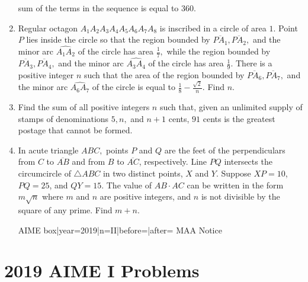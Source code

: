 \documentclass{article}
\begin{document}
\begin{enumerate}[label=\arabic*., itemsep=0.5em]
sum of the terms in the sequence is equal to \(360.\)\par \vspace{0.5em}\item Regular octagon \(A_1A_2A_3A_4A_5A_6A_7A_8\) is inscribed in a circle of area \(1.\) Point \(P\) lies inside the circle so that the region bounded by \(\overline{PA_1},\overline{PA_2},\) and the minor arc \(\widehat{A_1A_2}\) of the circle has area \(\tfrac{1}{7},\) while the region bounded by \(\overline{PA_3},\overline{PA_4},\) and the minor arc \(\widehat{A_3A_4}\) of the circle has area \(\tfrac{1}{9}.\) There is a positive integer \(n\) such that the area of the region bounded by \(\overline{PA_6},\overline{PA_7},\) and the minor arc \(\widehat{A_6A_7}\) of the circle is equal to \(\tfrac{1}{8}-\tfrac{\sqrt2}{n}.\) Find \(n.\)\par \vspace{0.5em}\item Find the sum of all positive integers \(n\) such that, given an unlimited supply of stamps of denominations \(5,n,\) and \(n+1\) cents, \(91\) cents is the greatest postage that cannot be formed.\par \vspace{0.5em}\item In acute triangle \(ABC,\) points \(P\) and \(Q\) are the feet of the perpendiculars from \(C\) to \(\overline{AB}\) and from \(B\) to \(\overline{AC}\), respectively. Line \(PQ\) intersects the circumcircle of \(\triangle ABC\) in two distinct points, \(X\) and \(Y\). Suppose \(XP=10\), \(PQ=25\), and \(QY=15\). The value of \(AB\cdot AC\) can be written in the form \(m\sqrt n\) where \(m\) and \(n\) are positive integers, and \(n\) is not divisible by the square of any prime. Find \(m+n\).



{{AIME box|year=2019|n=II|before=|after=}}
{{MAA Notice}}\par \vspace{0.5em}\end{enumerate}\newpage\section*{2019 AIME I Problems}
\end{document}

